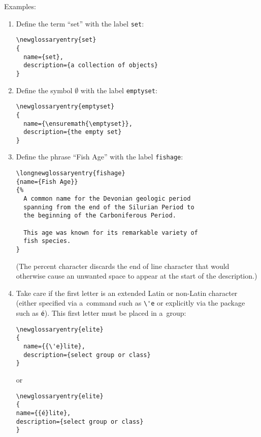 \documentclass{nlctdoc}
\begin{document}
Examples:
\begin{enumerate}
\item Define the term ``set'' with the label \texttt{set}:
\begin{verbatim}
\newglossaryentry{set}
{
  name={set},
  description={a collection of objects}
}
\end{verbatim}

\item Define the symbol $\emptyset$ with the label
\texttt{emptyset}:
\begin{verbatim}
\newglossaryentry{emptyset}
{
  name={\ensuremath{\emptyset}},
  description={the empty set}
}
\end{verbatim}

\item Define the phrase ``Fish Age'' with the label
\texttt{fishage}:
\begin{verbatim}
\longnewglossaryentry{fishage}
{name={Fish Age}}
{%
  A common name for the Devonian geologic period 
  spanning from the end of the Silurian Period to
  the beginning of the Carboniferous Period.

  This age was known for its remarkable variety of 
  fish species.
}
\end{verbatim}
(The percent character discards the end of line character that would
otherwise cause an unwanted space to appear at the start of the
description.)

\item Take care if the first letter is an extended Latin or
non-Latin character (either specified via a~command such as 
\verb|\'e| or explicitly via the  package such 
as \texttt{\'e}). This first letter must be placed in a~group:

\begin{verbatim}
\newglossaryentry{elite}
{
  name={{\'e}lite},
  description={select group or class}
}
\end{verbatim}
or
\begin{alltt}
\verb|\newglossaryentry{elite}|
\verb|{|
  name=\verb|{{|\'e\verb|}lite}|,
  description=\verb|{select group or class}|
\verb|}|
\end{alltt}
\end{enumerate}
\end{document}
